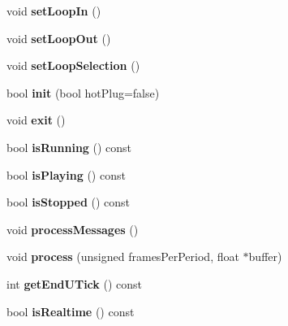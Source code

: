 \begin{DoxyCompactItemize}
\mbox{\label{class_ms_1_1_seq_a401a657e18c1980b6376bc93369dda4a}} 
void {\bfseries set\+Loop\+In} ()
\item 
\mbox{\label{class_ms_1_1_seq_a574a866690e74c34b6d53d4013739a82}} 
void {\bfseries set\+Loop\+Out} ()
\item 
\mbox{\label{class_ms_1_1_seq_a5126ff03f5a380a55ca7fd33df3b6ab6}} 
void {\bfseries set\+Loop\+Selection} ()
\item 
\mbox{\label{class_ms_1_1_seq_aba318ca3ad72f1ba0b8ec8df8231d6d7}} 
bool {\bfseries init} (bool hot\+Plug=false)
\item 
\mbox{\label{class_ms_1_1_seq_ae9a63dc41b897859eb55808138678370}} 
void {\bfseries exit} ()
\item 
\mbox{\label{class_ms_1_1_seq_adba136fcf260a720d121b1d4f926e238}} 
bool {\bfseries is\+Running} () const
\item 
\mbox{\label{class_ms_1_1_seq_abb1e3673970733b8564170ccee3c3b6e}} 
bool {\bfseries is\+Playing} () const
\item 
\mbox{\label{class_ms_1_1_seq_a3a858dfc93cf13fb97c0eeebc6f6a5af}} 
bool {\bfseries is\+Stopped} () const
\item 
\mbox{\label{class_ms_1_1_seq_a7e5f3d000df65db974be71186d290f7b}} 
void {\bfseries process\+Messages} ()
\item 
\mbox{\label{class_ms_1_1_seq_a1e6c16c9e7d6d26a42e779db7c647d07}} 
void {\bfseries process} (unsigned frames\+Per\+Period, float $\ast$buffer)
\item 
\mbox{\label{class_ms_1_1_seq_ab1fe99bb2cd5e26a1b63c02756cec9b8}} 
int {\bfseries get\+End\+U\+Tick} () const
\item 
\mbox{\label{class_ms_1_1_seq_adce7430cfb20b0b22bc9c280104dc8d2}} 
bool {\bfseries is\+Realtime} () const
\item 

\end{DoxyCompactItemize}
